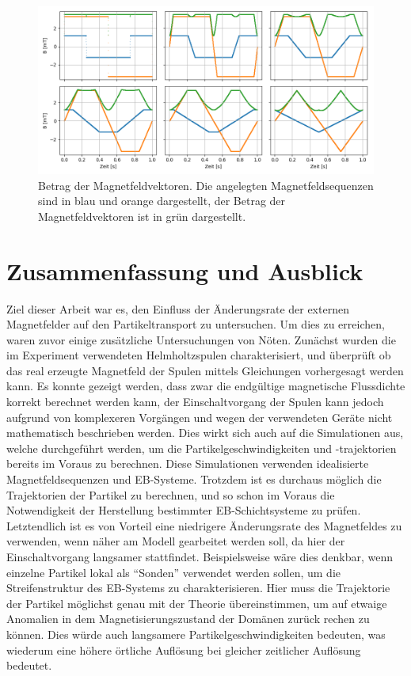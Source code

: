 \documentclass[page,pdftex,12pt,a4paper,twoside,openright]{scrbook}
\begin{document}
\begin{figure}[h]
\centering
\includegraphics[width=\textwidth]{./img/magnitude.png}
\caption{\label{fig-betrag}
Betrag der Magnetfeldvektoren. Die angelegten Magnetfeldsequenzen sind in blau und orange dargestellt, der Betrag der Magnetfeldvektoren ist in grün dargestellt.}
\end{figure}

\chapter{Zusammenfassung und Ausblick \label{sec-zusammenfassung}}
\label{sec:org23e8c2b}
Ziel dieser Arbeit war es, den Einfluss der Änderungsrate der externen Magnetfelder auf den Partikeltransport zu untersuchen. Um dies zu erreichen, waren zuvor einige zusätzliche Untersuchungen von Nöten. Zunächst wurden die im Experiment verwendeten Helmholtzspulen charakterisiert, und überprüft ob das real erzeugte Magnetfeld der Spulen mittels Gleichungen vorhergesagt werden kann. Es konnte gezeigt werden, dass zwar die endgültige magnetische Flussdichte korrekt berechnet werden kann, der Einschaltvorgang der Spulen kann jedoch aufgrund von komplexeren Vorgängen und wegen der verwendeten Geräte nicht mathematisch beschrieben werden. Dies wirkt sich auch auf die Simulationen aus, welche durchgeführt werden, um die Partikelgeschwindigkeiten und -trajektorien bereits im Voraus zu berechnen. Diese Simulationen verwenden idealisierte Magnetfeldsequenzen und EB-Systeme. Trotzdem ist es durchaus möglich die Trajektorien der Partikel zu berechnen, und so schon im Voraus die Notwendigkeit der Herstellung bestimmter EB-Schichtsysteme zu prüfen. Letztendlich ist es von Vorteil eine niedrigere Änderungsrate des Magnetfeldes zu verwenden, wenn näher am Modell gearbeitet werden soll, da hier der Einschaltvorgang langsamer stattfindet. Beispielsweise wäre dies denkbar, wenn einzelne Partikel lokal als "`Sonden"' verwendet werden sollen, um die Streifenstruktur des EB-Systems zu charakterisieren. Hier muss die Trajektorie der Partikel möglichst genau mit der Theorie übereinstimmen, um auf etwaige Anomalien in dem Magnetisierungszustand der Domänen zurück rechen zu können. Dies würde auch langsamere Partikelgeschwindigkeiten bedeuten, was wiederum eine höhere örtliche Auflösung bei gleicher zeitlicher Auflösung bedeutet.
\end{document}
